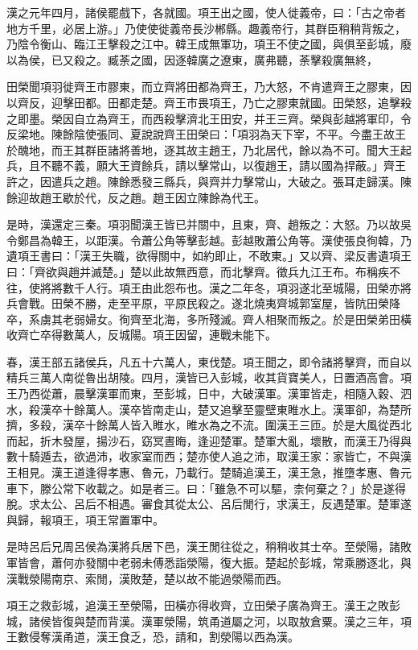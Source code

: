 \begin{pinyinscope}
漢之元年四月，諸侯罷戲下，各就國。項王出之國，使人徙義帝，曰：「古之帝者地方千里，必居上游。」乃使使徙義帝長沙郴縣。趣義帝行，其群臣稍稍背叛之，乃陰令衡山、臨江王擊殺之江中。韓王成無軍功，項王不使之國，與俱至彭城，廢以為侯，已又殺之。臧荼之國，因逐韓廣之遼東，廣弗聽，荼擊殺廣無終，

田榮聞項羽徙齊王市膠東，而立齊將田都為齊王，乃大怒，不肯遣齊王之膠東，因以齊反，迎擊田都。田都走楚。齊王市畏項王，乃亡之膠東就國。田榮怒，追擊殺之即墨。榮因自立為齊王，而西殺擊濟北王田安，并王三齊。榮與彭越將軍印，令反梁地。陳餘陰使張同、夏說說齊王田榮曰：「項羽為天下宰，不平。今盡王故王於醜地，而王其群臣諸將善地，逐其故主趙王，乃北居代，餘以為不可。聞大王起兵，且不聽不義，願大王資餘兵，請以擊常山，以復趙王，請以國為捍蔽。」齊王許之，因遣兵之趙。陳餘悉發三縣兵，與齊并力擊常山，大破之。張耳走歸漢。陳餘迎故趙王歇於代，反之趙。趙王因立陳餘為代王。

是時，漢還定三秦。項羽聞漢王皆已并關中，且東，齊、趙叛之：大怒。乃以故吳令鄭昌為韓王，以距漢。令蕭公角等擊彭越。彭越敗蕭公角等。漢使張良徇韓，乃遺項王書曰：「漢王失職，欲得關中，如約即止，不敢東。」又以齊、梁反書遺項王曰：「齊欲與趙并滅楚。」楚以此故無西意，而北擊齊。徵兵九江王布。布稱疾不往，使將將數千人行。項王由此怨布也。漢之二年冬，項羽遂北至城陽，田榮亦將兵會戰。田榮不勝，走至平原，平原民殺之。遂北燒夷齊城郭室屋，皆阬田榮降卒，系虜其老弱婦女。徇齊至北海，多所殘滅。齊人相聚而叛之。於是田榮弟田橫收齊亡卒得數萬人，反城陽。項王因留，連戰未能下。

春，漢王部五諸侯兵，凡五十六萬人，東伐楚。項王聞之，即令諸將擊齊，而自以精兵三萬人南從魯出胡陵。四月，漢皆已入彭城，收其貨寶美人，日置酒高會。項王乃西從蕭，晨擊漢軍而東，至彭城，日中，大破漢軍。漢軍皆走，相隨入穀、泗水，殺漢卒十餘萬人。漢卒皆南走山，楚又追擊至靈壁東睢水上。漢軍卻，為楚所擠，多殺，漢卒十餘萬人皆入睢水，睢水為之不流。圍漢王三匝。於是大風從西北而起，折木發屋，揚沙石，窈冥晝晦，逢迎楚軍。楚軍大亂，壞散，而漢王乃得與數十騎遁去，欲過沛，收家室而西；楚亦使人追之沛，取漢王家：家皆亡，不與漢王相見。漢王道逢得孝惠、魯元，乃載行。楚騎追漢王，漢王急，推墮孝惠、魯元車下，滕公常下收載之。如是者三。曰：「雖急不可以驅，柰何棄之？」於是遂得脫。求太公、呂后不相遇。審食其從太公、呂后閒行，求漢王，反遇楚軍。楚軍遂與歸，報項王，項王常置軍中。

是時呂后兄周呂侯為漢將兵居下邑，漢王閒往從之，稍稍收其士卒。至滎陽，諸敗軍皆會，蕭何亦發關中老弱未傅悉詣滎陽，復大振。楚起於彭城，常乘勝逐北，與漢戰滎陽南京、索閒，漢敗楚，楚以故不能過滎陽而西。

項王之救彭城，追漢王至滎陽，田橫亦得收齊，立田榮子廣為齊王。漢王之敗彭城，諸侯皆復與楚而背漢。漢軍滎陽，筑甬道屬之河，以取敖倉粟。漢之三年，項王數侵奪漢甬道，漢王食乏，恐，請和，割滎陽以西為漢。


\end{pinyinscope}
